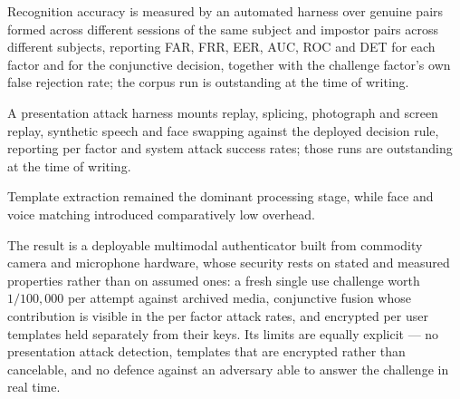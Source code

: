 \documentclass[runningheads]{llncs}
\newif\ifresultsready
\newif\ifattacksready
\providecommand{\EvalCorpusName}{n/a}
\providecommand{\EvalGenuinePairs}{n/a}
\providecommand{\EvalImpostorPairs}{n/a}
\providecommand{\EvalFaceEER}{n/a}
\providecommand{\EvalFaceAUC}{n/a}
\providecommand{\EvalVoiceEER}{n/a}
\providecommand{\EvalVoiceAUC}{n/a}
\providecommand{\EvalFusedFAR}{n/a}
\providecommand{\EvalFusedFRR}{n/a}
\providecommand{\EvalChallengeFRR}{n/a}
\providecommand{\AttackChallengeSpace}{100{,}000}
\begin{document}
\ifresultsready
On \EvalCorpusName, over \EvalGenuinePairs{} genuine pairs formed across different sessions of the same subject and \EvalImpostorPairs{} impostor pairs across different subjects, the face factor attains an EER of \EvalFaceEER\% (AUC \EvalFaceAUC) and the speaker factor \EvalVoiceEER\% (AUC \EvalVoiceAUC); at the deployed thresholds the conjunctive decision gives a FAR of \EvalFusedFAR\% and an FRR of \EvalFusedFRR\%. The challenge factor rejects \EvalChallengeFRR\% of correctly spoken responses, and is the dominant source of failure for legitimate users --- the cost conjunctive fusion imposes in exchange for the false acceptance rate it buys.
\else
Recognition accuracy is measured by an automated harness over genuine pairs formed across different sessions of the same subject and impostor pairs across different subjects, reporting FAR, FRR, EER, AUC, ROC and DET for each factor and for the conjunctive decision, together with the challenge factor's own false rejection rate; the corpus run is outstanding at the time of writing.
\fi
\ifattacksready
Against presentation attacks, replay of archived recordings, face--voice splicing in both directions, photograph and screen replay, synthetic speech and face swapping were mounted against the deployed decision rule and reported per factor as well as for the system. The per factor view is the informative one: the face factor is accepted by media an adversary can obtain trivially, and the system holds because the speaker factor and the fresh challenge cannot be satisfied at the same time from archived material.
\else
A presentation attack harness mounts replay, splicing, photograph and screen replay, synthetic speech and face swapping against the deployed decision rule, reporting per factor and system attack success rates; those runs are outstanding at the time of writing.
\fi
Template extraction remained the dominant processing stage, while face and voice matching introduced comparatively low overhead.

The result is a deployable multimodal authenticator built from commodity camera and microphone hardware, whose security rests on stated and measured properties rather than on assumed ones: a fresh single use challenge worth $1/\AttackChallengeSpace$ per attempt against archived media, conjunctive fusion whose contribution is visible in the per factor attack rates, and encrypted per user templates held separately from their keys. Its limits are equally explicit --- no presentation attack detection, templates that are encrypted rather than cancelable, and no defence against an adversary able to answer the challenge in real time.
\end{document}
